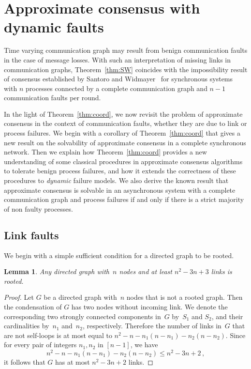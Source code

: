 \documentclass[a4paper]{article}
\theoremstyle{newthm}
\newtheorem{lem}[thm]{Lemma}
\renewcommand{\leq}{\leqslant}
\begin{document}
		
\section{Approximate consensus with dynamic faults}

Time varying communication graph may result from benign communication faults in the
	case of message losses.
With such an interpretation of missing links in  communication graphs, Theorem~\ref{thm:SW} 
	coincides with the impossibility result of consensus established by Santoro and Widmayer~\cite{SW89}
	for synchronous systems with $n$ processes connected by  a complete communication graph and 
	$n-1$ communication faults per round.

In the light of Theorem~\ref{thm:coord}, we now revisit the problem of approximate consensus in the
	context of communication faults, whether they are due to  link or process failures.
We begin with a corollary of Theorem~\ref{thm:coord} that gives a new result  on the solvability 
	of approximate consensus in a complete synchronous network.
Then we explain how Theorem~\ref{thm:coord} provides a new understanding of some classical procedures 
	in approximate consensus algorithms to tolerate  benign process failures, and how it extends
	the  correctness of these procedures to {\em dynamic}  failure models.
We also derive the known result that approximate consensus is solvable in an asynchronous system
	with a complete communication graph and process failures if and only if there is a strict majority of non faulty
	processes.

	
\subsection{Link faults}

We begin with a simple sufficient condition for a directed graph to be rooted.
 
\begin{lem}\label{lem:2n-2}
Any directed graph with~$n$ nodes and  at
	least $n^2 - 3n + 3$ links is rooted.
\end{lem}
\begin{proof}
Let $G$ be a directed graph with~$n$ nodes that  is not a rooted graph.
Then the condensation of $G$ has   two nodes  without incoming link.
We denote the corresponding two strongly connected components in~$G$ by~$S_1$ and $S_2$,
	and their cardinalities by~$n_1$ and~$n_2$, respectively.
Therefore the number of links in~$G$ that are not self-loops is at most equal to $n^2-n - n_1 (n-n_1) - n_2 (n-n_2)$.
Since  for every pair of  integers $n_1,n_2$ in $[n-1]$, we have
	$$ n^2-n - n_1 (n-n_1) - n_2 (n-n_2) \leq  n^2 -3n +2 \, ,$$
	 it follows that $G$ has at most  $n^2 - 3n + 2$ links.
\end{proof}
\end{document}
